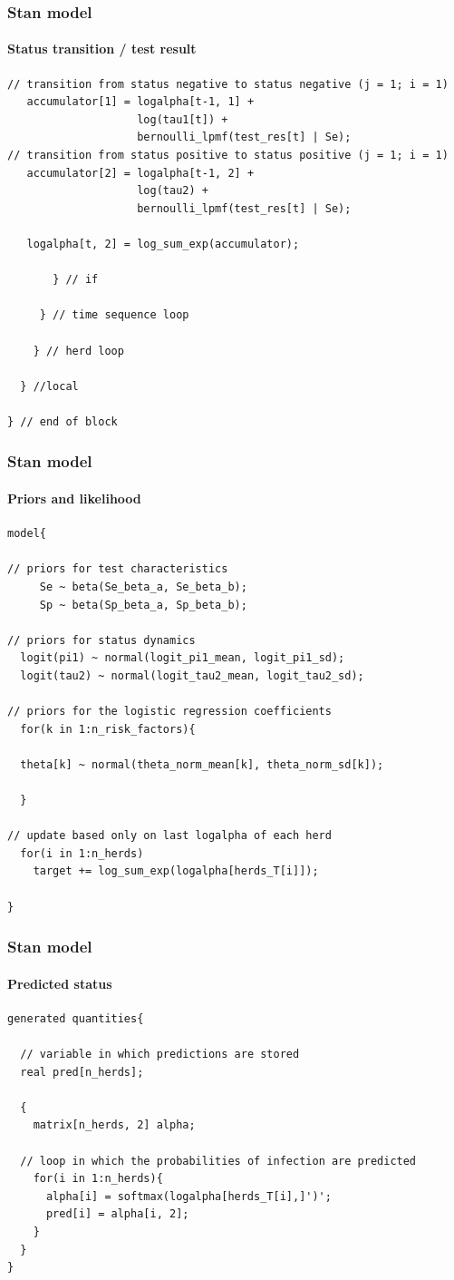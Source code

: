 \documentclass{beamer}
\begin{document}
\begin{frame}[fragile]
\frametitle{Stan model}
\framesubtitle{Status transition / test result}
\scriptsize
\begin{verbatim}
// transition from status negative to status negative (j = 1; i = 1)
   accumulator[1] = logalpha[t-1, 1] + 
                    log(tau1[t]) + 
                    bernoulli_lpmf(test_res[t] | Se);
// transition from status positive to status positive (j = 1; i = 1)
   accumulator[2] = logalpha[t-1, 2] + 
                    log(tau2) + 
                    bernoulli_lpmf(test_res[t] | Se);

   logalpha[t, 2] = log_sum_exp(accumulator);

       } // if

     } // time sequence loop

    } // herd loop

  } //local

} // end of block
\end{verbatim}
\end{frame}


\begin{frame}[fragile]
\frametitle{Stan model}
\framesubtitle{Priors and likelihood}
\scriptsize
\begin{verbatim}
model{

// priors for test characteristics
     Se ~ beta(Se_beta_a, Se_beta_b);
     Sp ~ beta(Sp_beta_a, Sp_beta_b);

// priors for status dynamics
  logit(pi1) ~ normal(logit_pi1_mean, logit_pi1_sd);
  logit(tau2) ~ normal(logit_tau2_mean, logit_tau2_sd);

// priors for the logistic regression coefficients
  for(k in 1:n_risk_factors){

  theta[k] ~ normal(theta_norm_mean[k], theta_norm_sd[k]);

  }

// update based only on last logalpha of each herd
  for(i in 1:n_herds)
    target += log_sum_exp(logalpha[herds_T[i]]);

}
\end{verbatim}
\end{frame}


\begin{frame}[fragile]
\frametitle{Stan model}
\framesubtitle{Predicted status}
\scriptsize
\begin{verbatim}
generated quantities{

  // variable in which predictions are stored
  real pred[n_herds];

  {
    matrix[n_herds, 2] alpha;

  // loop in which the probabilities of infection are predicted
    for(i in 1:n_herds){
      alpha[i] = softmax(logalpha[herds_T[i],]')';
      pred[i] = alpha[i, 2];
    }
  }
}
\end{verbatim}
\end{frame}
\end{document}
